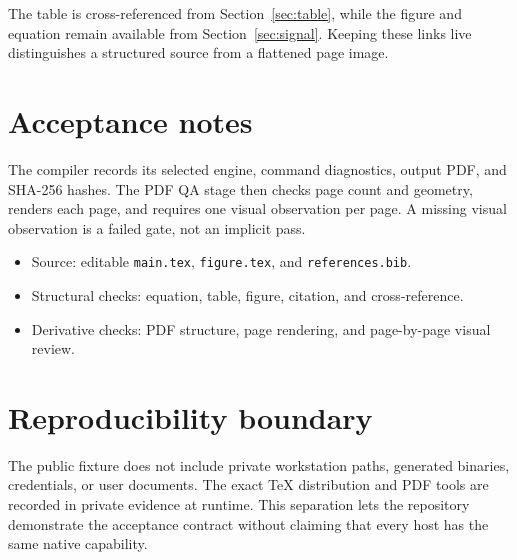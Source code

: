 \documentclass[11pt]{article}
\begin{document}
The table is cross-referenced from Section~\ref{sec:table}, while the figure and equation
remain available from Section~\ref{sec:signal}. Keeping these links live distinguishes a
structured source from a flattened page image.

\clearpage
\section{Acceptance notes}\label{sec:notes}
The compiler records its selected engine, command diagnostics, output PDF, and SHA-256 hashes.
The PDF QA stage then checks page count and geometry, renders each page, and requires one visual
observation per page. A missing visual observation is a failed gate, not an implicit pass.

\begin{itemize}
  \item Source: editable \texttt{main.tex}, \texttt{figure.tex}, and \texttt{references.bib}.
  \item Structural checks: equation, table, figure, citation, and cross-reference.
  \item Derivative checks: PDF structure, page rendering, and page-by-page visual review.
\end{itemize}

\clearpage
\section{Reproducibility boundary}\label{sec:boundary}
The public fixture does not include private workstation paths, generated binaries, credentials,
or user documents. The exact TeX distribution and PDF tools are recorded in private evidence at
runtime. This separation lets the repository demonstrate the acceptance contract without
claiming that every host has the same native capability.



\end{document}
